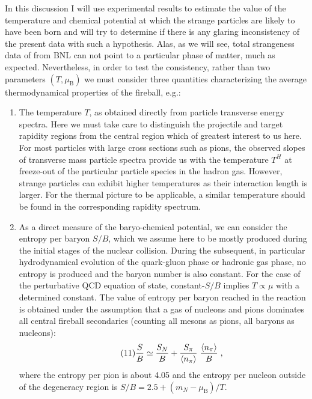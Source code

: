 \begin{mdframed}[linecolor=gray,roundcorner=12pt,backgroundcolor=Dandelion!15,linewidth=1pt,leftmargin=0cm,rightmargin=0cm,topline=true,bottomline=true,skipabove=12pt]
In this discussion I will use experimental results to estimate the value of the temperature and chemical potential at which the strange particles are likely to have been born and will try to determine if there is any glaring inconsistency of the present data with such a hypothesis. Alas, as we will see, total strangeness data of from BNL can not point to a particular phase of matter, much as expected. Nevertheless, in order to test the consistency, rather than two parameters $(T,\mu_\mathrm{B})$ we must consider three quantities characterizing the average thermodynamical properties of the fireball, e.g.:
\begin{enumerate}
\item The temperature $T$, as obtained directly from particle transverse energy spectra. Here we must take care to distinguish the projectile and target rapidity regions from the central region which of greatest interest to us here. For most particles with large cross sections such as pions, the observed slopes of transverse mass particle spectra provide us with the temperature $T^{H}$ at freeze-out of the particular particle species in the hadron gas. However, strange particles can exhibit higher temperatures as their interaction length is larger. For the thermal picture to be applicable, a similar temperature should be found in the corresponding rapidity spectrum.
%
\item As a direct measure of the baryo-chemical potential, we can consider the entropy per baryon $S/B$, which we assume here to be mostly produced during the initial stages of the nuclear collision. During the subsequent, in particular hydrodynamical evolution of the quark-gluon phase or hadronic gas phase, no entropy is produced and the baryon number is also constant. For the case of the perturbative QCD equation of state, constant-$S/B$ implies $T \propto \mu$ with a determined constant\footnotemark[20,21]. The value of entropy per baryon reached in the reaction is obtained under the assumption that a gas of nucleons and pions dominates all central fireball secondaries (counting all mesons as pions, all baryons as nucleons)\footnotemark[22]:
\begin{equation}\label{el}\tag{11}
{S\over B} \simeq {S_N\over B} + {S_\pi \over \langle{n_{\pi}}\rangle}\;{\langle{n_{\pi}}\rangle \over B}\;,
\end{equation}
where the entropy per pion is about 4.05 and the entropy per nucleon outside of the degeneracy region is $S/B = 2.5 + (m_N-\mu_\mathrm{B})/T$.
%

\end{enumerate}
\end{mdframed}
